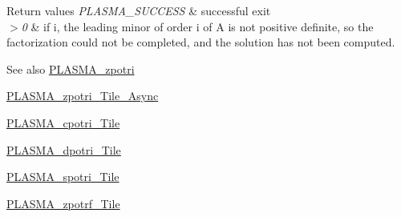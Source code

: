 \begin{DoxyRetVals}{Return values}
{\em P\+L\+A\+S\+M\+A\+\_\+\+S\+U\+C\+C\+E\+S\+S} & successful exit \\
\hline
{\em $>$0} & if i, the leading minor of order i of A is not positive definite, so the factorization could not be completed, and the solution has not been computed.\\
\hline
\end{DoxyRetVals}
\begin{DoxySeeAlso}{See also}
\hyperlink{group__PLASMA__Complex64__t_ga6dd563144dd8c7f29a58659f220f44a0_ga6dd563144dd8c7f29a58659f220f44a0}{P\+L\+A\+S\+M\+A\+\_\+zpotri} 

\hyperlink{group__PLASMA__Complex64__t__Tile__Async_ga9c9b672c28f4f191528f07cd0d66774e_ga9c9b672c28f4f191528f07cd0d66774e}{P\+L\+A\+S\+M\+A\+\_\+zpotri\+\_\+\+Tile\+\_\+\+Async} 

\hyperlink{group__PLASMA__Complex32__t__Tile_gaceabc04acf5032a6a9e0415cab2e5abe_gaceabc04acf5032a6a9e0415cab2e5abe}{P\+L\+A\+S\+M\+A\+\_\+cpotri\+\_\+\+Tile} 

\hyperlink{group__double__Tile_gab78b1dc223af4cceea99502e98e9fb72_gab78b1dc223af4cceea99502e98e9fb72}{P\+L\+A\+S\+M\+A\+\_\+dpotri\+\_\+\+Tile} 

\hyperlink{group__float__Tile_ga3f2b23232748f3fde3e58d06757af2ff_ga3f2b23232748f3fde3e58d06757af2ff}{P\+L\+A\+S\+M\+A\+\_\+spotri\+\_\+\+Tile} 

\hyperlink{group__PLASMA__Complex64__t__Tile_gaf062088380cfda1a7dc01bf9596c91e3_gaf062088380cfda1a7dc01bf9596c91e3}{P\+L\+A\+S\+M\+A\+\_\+zpotrf\+\_\+\+Tile} 
\end{DoxySeeAlso}
\hypertarget{group__PLASMA__Complex64__t__Tile_gad13147593a1970092f560e8cb54925b8_gad13147593a1970092f560e8cb54925b8}{}
